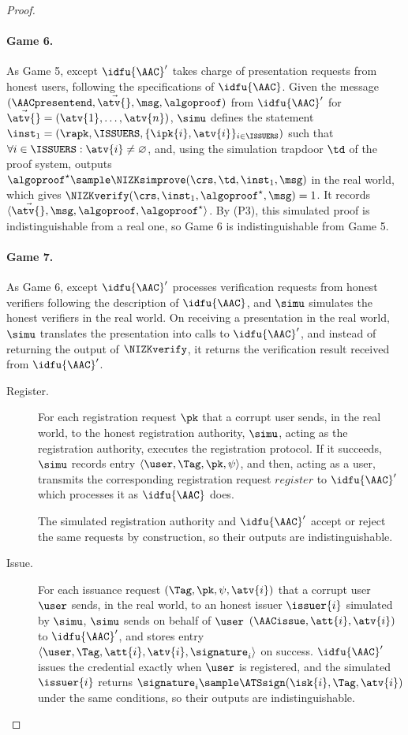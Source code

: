 \begin{proof}
  \paragraph{Game 6.} As Game 5, except $\idfu{\AAC}'$ takes charge of presentation
requests from honest users, following the specifications of $\idfu{\AAC}$.
Given the message $(\AACpresentend, \vec{\atv{}}, \msg, \algoproof)$ from
$\idfu{\AAC}'$ for $\vec{\atv{}} = (\atv{1}, \ldots, \atv{n})$, $\simu$ defines
the statement $\inst_1 = (\rapk,\allowbreak \ISSUERS,\allowbreak \{\ipk{i}, \atv{i}\}_{i \in \ISSUERS})$ such that $\forall i \in
\ISSUERS: \atv{i} \neq \varnothing$, and, using the simulation trapdoor $\td$
of the proof system, outputs $\algoproof^\star
\sample \NIZKsimprove(\crs, \td, \inst_1, \msg)$ in the real world, which gives
$\NIZKverify(\crs, \inst_1, \algoproof^\star, \msg) = 1$. It records
$\langle \vec{\atv{}}, \msg, \algoproof, \algoproof^\star \rangle$. By (P3), this
simulated proof is indistinguishable from a real one, so Game 6 is
indistinguishable from Game 5.

  \paragraph{Game 7.} As Game 6, except $\idfu{\AAC}'$ processes verification
requests from honest verifiers following the description of $\idfu{\AAC}$, and
$\simu$ simulates the honest verifiers in the real world.  On receiving a
presentation in the real world, $\simu$ translates the presentation into calls to
$\idfu{\AAC}'$, and instead of returning the output of $\NIZKverify$, it returns
the verification result received from $\idfu{\AAC}'$.

  \begin{description}

    \item[Register.] For each registration request $\pk$ that a corrupt user
sends, in the real world, to the honest registration authority, $\simu$, acting
as the registration authority, executes the registration protocol. If it
succeeds, $\simu$ records entry $\langle\user, \Tag, \pk, \psi
\rangle$, and then, acting as a user, transmits the corresponding registration
request $register$ to $\idfu{\AAC}'$ which processes it as
$\idfu{\AAC}$ does.

      The simulated registration authority and $\idfu{\AAC}'$ accept or reject
the same requests by construction, so their outputs are indistinguishable.

    \item[Issue.] For each issuance request $(\Tag, \pk, \psi, \atv{i})$ that a
corrupt user $\user$ sends, in the real world, to an honest issuer $\issuer{i}$
simulated by $\simu$, $\simu$ sends on behalf of $\user$ $(\AACissue, \att{i},
\atv{i})$ to $\idfu{\AAC}'$, and stores entry $\langle \user, \Tag, \att{i},
\atv{i}, \signature_i\rangle$ on success.  $\idfu{\AAC}'$ issues the credential
exactly when $\user$ is registered, and the simulated $\issuer{i}$ returns $\signature_i \sample
\ATSsign(\isk{i}, \Tag, \atv{i})$ under the same conditions, so their outputs
are indistinguishable.


\end{description}
\end{proof}
